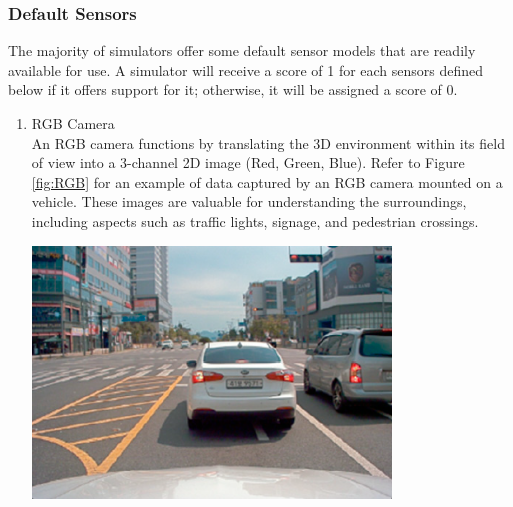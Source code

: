 \documentclass[12pt,twoside,a4paper,parskip]{scrbook} %
\begin{document}
\subsubsection{Default Sensors}
The majority of simulators offer some default sensor models that are readily available for use. A simulator will receive a score of 1 for each sensors defined below if it offers support for it; otherwise, it will be assigned a score of 0.
\begin{enumerate}[label=\alph*.]
    \item RGB Camera \\
    An RGB camera functions by translating the 3D environment within its field of view into a 3-channel 2D image (Red, Green, Blue). Refer to Figure \ref{fig:RGB} \cite{senimage} for an example of data captured by an RGB camera mounted on a vehicle. These images are valuable for understanding the surroundings, including aspects such as traffic lights, signage, and pedestrian crossings.

    
    \begin{minipage}[t]{\linewidth}
        \centering
        \includegraphics[width=0.75\textwidth]{Images/RGB.png}
        \label{fig:RGB}
        \vspace{-\baselineskip} %
    \end{minipage}
    \hfill
    

\end{enumerate}
\end{document}
